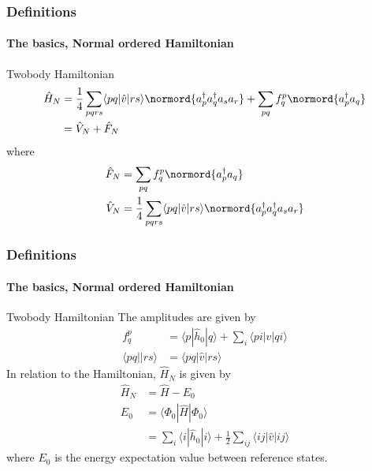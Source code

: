 \documentclass[compress]{beamer}
\newcommand*{\ket}[1]{|#1\rangle}
\newcommand*{\bra}[1]{\langle#1|}
\newcommand{\element}[3]
        {\bra{#1}#2\ket{#3}}
\begin{document}
\begin{frame}
    \frametitle{Definitions}
    \framesubtitle{The basics, Normal ordered Hamiltonian}

    \begin{block}{Twobody Hamiltonian}
    \begin{align*}
        \hat{H}_N &= 
            \frac{1}{4} \sum_{pqrs} \bra{pq}\hat{v}\ket{rs} \normord{a^\dagger_p a^\dagger_q a_s  a_r} 
            + \sum_{pq} f_q^p \normord{a^\dagger_p a_q} \\
        &= \hat{V}_N + \hat{F}_N
    \end{align*}
    where
    \begin{subequations}
    \begin{align*}
        \hat{F}_N &= \sum_{pq} f_q^p \normord{a^\dagger_p a_q} \\
        \hat{V}_N &= \frac{1}{4} \sum_{pqrs} \bra{pq}\hat{v}\ket{rs} \normord{a^\dagger_p a^\dagger_q a_s  a_r} \\
    \end{align*}
    \end{subequations}
    \end{block}
\end{frame}
\begin{frame}[fragile]
    \frametitle{Definitions}
    \framesubtitle{The basics, Normal ordered Hamiltonian}

    \small
    \begin{block}{Twobody Hamiltonian}
    The amplitudes are given by
    \begin{subequations}
    \begin{align*}
        f_q^p &= \element{p}{\hat{h}_0}{q} + \sum_i \element{pi}{\hat{v}}{qi} \\
        \bra{pq}\ket{rs} &= \element{pq}{\hat{v}}{rs}
    \end{align*}
    \end{subequations}
    In relation to the Hamiltonian, $\hat{H}_N$ is given by
    \begin{align*}
        \hat{H}_N &= \hat{H} - E_0 \\
        E_0 &= \element{\Phi_0}{\hat{H}}{\Phi_0} \\
            &= \sum_i \element{i}{\hat{h}_0}{i}
                + \frac{1}{2} \sum_{ij} \element{ij}{\hat{v}}{ij}
    \end{align*}
    where $E_0$ is the energy expectation value between reference states.
    \end{block}
\end{frame}










\end{document}
